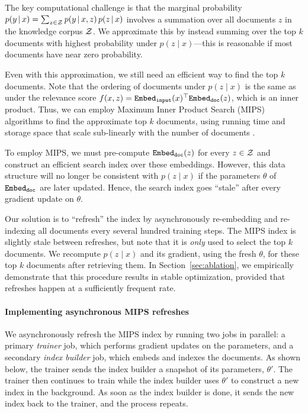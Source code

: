 \documentclass{article}
\begin{document}
The key computational challenge is that the marginal probability
$p(y\,|\, x) = \sum_{z \in \mathcal{Z}} p(y\,|\, x,z)\,p(z \,|\, x)$
involves a summation over all documents $z$ in the knowledge corpus $\mathcal{Z}$. We approximate this by instead summing over the top $k$ documents with highest probability under $p(z \mid x)$---this is reasonable if most documents have near zero probability.

Even with this approximation, we still need an efficient way to find the top $k$ documents. Note that the ordering of documents under $p(z \mid  x)$ is the same as under the relevance score $f(x, z) = \mathtt{Embed_{input}}(x)^\top \mathtt{Embed_{doc}}(z)$, which is an inner product. Thus, we can employ Maximum Inner Product Search (MIPS) algorithms to find the approximate top $k$ documents, using running time and storage space that scale sub-linearly with the number of documents \cite{mips_cone,mips_alsh,mips_binary}.

To employ MIPS, we must pre-compute $\mathtt{Embed_{doc}}(z)$ for every $z \in \mathcal{Z}$  and construct an efficient search index over these embeddings. However, this data structure will no longer be consistent with $p(z \mid x)$ if the parameters $\theta$ of $\mathtt{Embed_{doc}}$ are later updated. Hence, the search index goes ``stale'' after every gradient update on $\theta$.

Our solution is to ``refresh'' the index by asynchronously re-embedding and re-indexing all documents every several hundred training steps. The MIPS index is slightly stale between refreshes, but note that it is {\em only} used to select the top $k$ documents. We recompute $p(z \mid x)$ and its gradient, using the fresh $\theta$, for these top $k$ documents after retrieving them.
In Section~\ref{sec:ablation}, we empirically demonstrate that this procedure results in stable optimization, provided that refreshes happen at a sufficiently frequent rate.

\paragraph{Implementing asynchronous MIPS refreshes}
We asynchronously refresh the MIPS index by running two jobs in parallel: a primary {\em trainer} job, which performs gradient updates on the parameters, and a secondary {\em index builder} job, which embeds and indexes the documents. As shown below, the trainer sends the index builder a snapshot of its parameters, $\theta'$. The trainer then continues to train while the index builder uses $\theta'$ to construct a new index in the background. As soon as the index builder is done, it sends the new index back to the trainer, and the process repeats.
\end{document}
